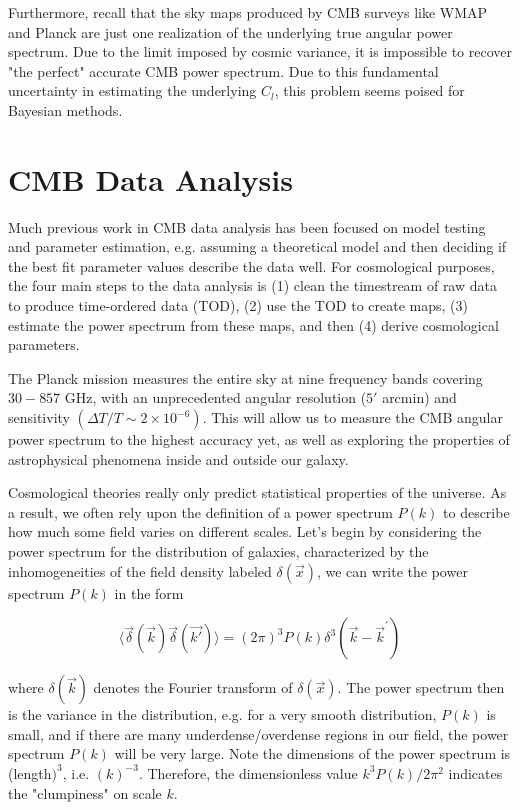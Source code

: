 \documentclass[12pt]{article}
\begin{document}
Furthermore, recall that the sky maps produced by CMB surveys like WMAP and Planck are just one realization of the underlying true angular power spectrum. Due to the limit imposed by cosmic variance, it is impossible to recover "the perfect" accurate CMB power spectrum. Due to this fundamental uncertainty in estimating the underlying $C_l$, this problem seems poised for Bayesian methods.

\section{CMB Data Analysis}


Much previous work in CMB data analysis has been focused on model testing and parameter estimation, e.g. assuming a theoretical model and then deciding if the best fit parameter values describe the data well. For cosmological purposes, the four main steps to the data analysis is (1) clean the timestream of raw data to produce time-ordered data (TOD), (2) use the TOD to create maps, (3) estimate the power spectrum from these maps, and then (4) derive cosmological parameters.

The Planck mission measures the entire sky at nine frequency bands covering $30-857$ GHz, with an unprecedented angular resolution ($5'$ arcmin) and sensitivity $(\Delta T/T\sim2\times10^{-6})$. This will allow us to measure the CMB angular power spectrum to the highest accuracy yet, as well as exploring the properties of astrophysical phenomena inside and outside our galaxy. 




Cosmological theories really only predict statistical properties of the universe. As a result, we often rely upon the definition of a power spectrum $P(k)$ to describe how much some field varies on different scales. Let's begin by considering the power spectrum for the distribution of galaxies, characterized by the inhomogeneities of the field density labeled $\delta(\vec{x})$, we can write the power spectrum $P(k)$ in the form

\begin{equation}
\langle\vec{\delta}(\vec{k})\vec{\delta}(\vec{k'})\rangle=(2\pi)^3P(k)\delta^{3}(\vec{k}-\vec{k}^{'})
\end{equation}

where $\delta(\vec{k})$ denotes the Fourier transform of $\delta(\vec{x})$. The power spectrum then is the variance in the distribution, e.g. for a very smooth distribution, $P(k)$ is small, and if there are many underdense/overdense regions in our field, the power spectrum $P(k)$ will be very large. Note the dimensions of the power spectrum is (length$)^3$, i.e. $(k)^{-3}$. Therefore, the dimensionless value $k^3P(k)/2\pi^2$ indicates the "clumpiness" on scale $k$. 
\end{document}
